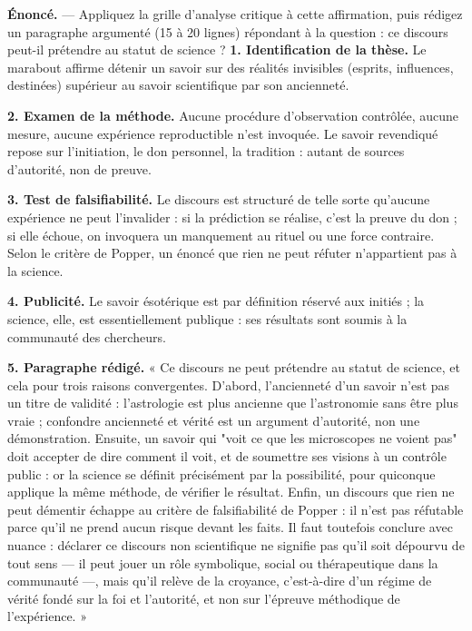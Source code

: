 \documentclass[11pt]{article}
\begin{document}
\begin{exoresolu}
\textbf{Énoncé.} — Appliquez la grille d'analyse critique à cette affirmation, puis rédigez un paragraphe argumenté (15 à 20 lignes) répondant à la question : ce discours peut-il prétendre au statut de science ?
\tcblower
\textbf{1. Identification de la thèse.} Le marabout affirme détenir un savoir sur des réalités invisibles (esprits, influences, destinées) supérieur au savoir scientifique par son ancienneté.

\textbf{2. Examen de la méthode.} Aucune procédure d'observation contrôlée, aucune mesure, aucune expérience reproductible n'est invoquée. Le savoir revendiqué repose sur l'initiation, le don personnel, la tradition : autant de sources d'autorité, non de preuve.

\textbf{3. Test de falsifiabilité.} Le discours est structuré de telle sorte qu'aucune expérience ne peut l'invalider : si la prédiction se réalise, c'est la preuve du don ; si elle échoue, on invoquera un manquement au rituel ou une force contraire. Selon le critère de Popper, un énoncé que rien ne peut réfuter n'appartient pas à la science.

\textbf{4. Publicité.} Le savoir ésotérique est par définition réservé aux initiés ; la science, elle, est essentiellement publique : ses résultats sont soumis à la communauté des chercheurs.

\textbf{5. Paragraphe rédigé.} « Ce discours ne peut prétendre au statut de science, et cela pour trois raisons convergentes. D'abord, l'ancienneté d'un savoir n'est pas un titre de validité : l'astrologie est plus ancienne que l'astronomie sans être plus vraie ; confondre ancienneté et vérité est un argument d'autorité, non une démonstration. Ensuite, un savoir qui "voit ce que les microscopes ne voient pas" doit accepter de dire comment il voit, et de soumettre ses visions à un contrôle public : or la science se définit précisément par la possibilité, pour quiconque applique la même méthode, de vérifier le résultat. Enfin, un discours que rien ne peut démentir échappe au critère de falsifiabilité de Popper : il n'est pas réfutable parce qu'il ne prend aucun risque devant les faits. Il faut toutefois conclure avec nuance : déclarer ce discours non scientifique ne signifie pas qu'il soit dépourvu de tout sens — il peut jouer un rôle symbolique, social ou thérapeutique dans la communauté —, mais qu'il relève de la croyance, c'est-à-dire d'un régime de vérité fondé sur la foi et l'autorité, et non sur l'épreuve méthodique de l'expérience. »
\end{exoresolu}
\end{document}
